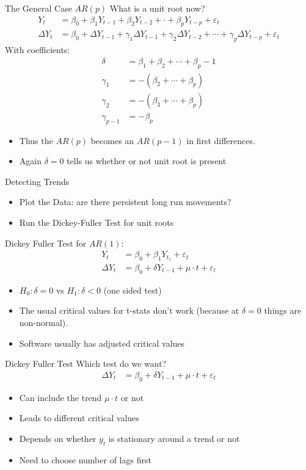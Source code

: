 \begin{frame}{The General Case $AR(p)$}
What is a unit root now?
\begin{align*}
Y_t &= \beta_0 + \beta_1 Y_{t-1} + \beta_2 Y_{t-2} + \cdot + \beta_p Y_{t-p} + \varepsilon_t\\
\Delta Y_t &= \beta_0 + \Delta Y_{t-1} + \gamma_1 \Delta Y_{t-1} + \gamma_2 \Delta Y_{t-2} +  \cdots +  \gamma_p \Delta Y_{t-p}  + \varepsilon_t
\end{align*}
With coefficients:
\begin{align*}
\delta &= \beta_1 + \beta_2 + \cdots + \beta_p -1\\
\gamma_1 &=  -(\beta_2 + \cdots + \beta_p)\\
\gamma_2 &=  -(\beta_3 + \cdots + \beta_p)\\
\gamma_{p-1} &=  -\beta_p
\end{align*}
\begin{itemize}
    \item Thus the $AR(p)$ becomes an $AR(p-1)$ in first differences.
    \item Again $\delta=0$ tells us whether or not unit root is present
\end{itemize}
\end{frame}

\begin{frame}{Detecting Trends}
\begin{itemize}
\item Plot the Data: are there persistent long run movements?
\item Run the Dickey-Fuller Test for unit roots
\end{itemize}
Dickey Fuller Test for $AR(1)$:
\begin{align*}
Y_t &= \beta_0 + \beta_1 Y_{t_1} +\varepsilon_t\\
\Delta Y_t &= \beta_0 + \delta Y_{t-1} + \mu \cdot t + \varepsilon_t
\end{align*}
\begin{itemize}
\item $H_0: \delta = 0$ vs $H_1: \delta < 0$ (one sided test)
\item The usual critical values for t-stats don't work (because at $\delta=0$ things are non-normal).
\item Software usually has adjusted critical values
\end{itemize}
\end{frame}


\begin{frame}{Dickey Fuller Test}
Which test do we want?
\begin{align*}
\Delta Y_t &= \beta_0 + \delta Y_{t-1} + \mu \cdot t + \varepsilon_t
\end{align*}
\begin{itemize}
\item Can include the trend $\mu \cdot t$ or not
\item Leads to different critical values
\item Depends on whether $y_t$ is stationary around a trend or not
\item Need to choose number of lags first
\end{itemize}
\end{frame}


